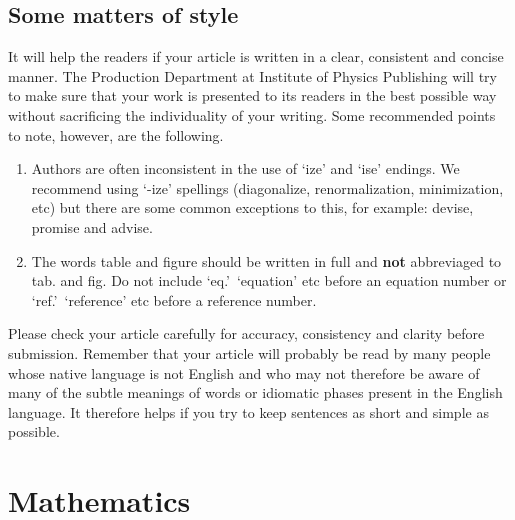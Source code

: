 \documentclass[12pt]{iopart}
\begin{document}
\subsection{Some matters of style}
It will help the readers if your article is written in a clear,
consistent and concise manner. The Production Department at Institute of Physics
Publishing will try to make sure that your work is presented to its
readers in the best possible way without sacrificing the individuality of
your writing. Some recommended 
points to note, however, are the following.
\begin{enumerate}
\item Authors are often inconsistent in the use of `ize' and `ise' endings.
We recommend using `-ize' spellings (diagonalize, 
renormalization, minimization, etc) but there are some common 
exceptions to this, for example: devise, 
promise and advise.

\item The words table and figure should be written 
in full and {\bf not} abbreviaged to tab. and fig. Do not include `eq.'\, `equation' etc before an equation number or `ref.'\, `reference' etc before a reference number.
\end{enumerate}

Please check your article carefully for accuracy, consistency and clarity before
submission. Remember that your article will probably be read by many
people whose native language is not English and who may not therefore 
be aware of many of the subtle meanings of words or idiomatic phases
present in the English language. It therefore helps if you try to keep
sentences as short and simple as possible.

\section{Mathematics}
\end{document}
